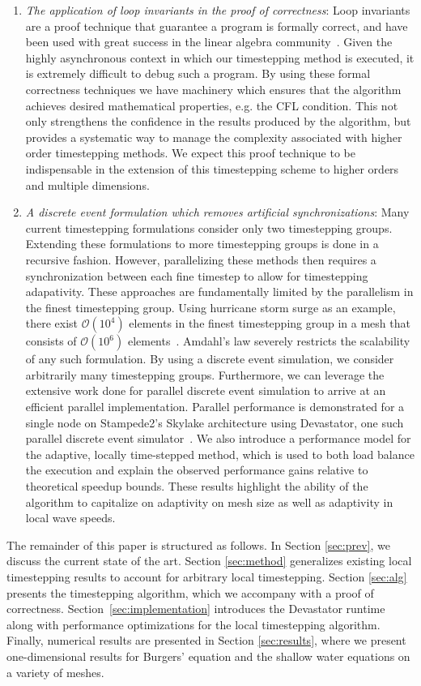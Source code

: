 \begin{enumerate}
    \item {\em The application of loop invariants in the proof of correctness}: Loop invariants are a proof technique that guarantee a program is formally correct, and have been used with great success in the linear algebra community~\cite{Bientinesi2011}. Given the highly asynchronous context in which our timestepping method is executed, it is extremely difficult to debug such a program. By using these formal correctness techniques we have machinery which ensures that the algorithm achieves desired mathematical properties, e.g. the CFL condition. This not only strengthens the confidence in the results produced by the algorithm, but provides a systematic way to manage the complexity associated with higher order timestepping methods. We expect this proof technique to be indispensable in the extension of this timestepping scheme to higher orders and multiple dimensions.
    \item {\em A discrete event formulation which removes artificial synchronizations}: Many current timestepping formulations consider only two timestepping groups. Extending these formulations to more timestepping groups is done in a recursive fashion. However, parallelizing these methods then requires a synchronization between each fine timestep to allow for timestepping adapativity. These approaches are fundamentally limited by the parallelism in the finest timestepping group. Using hurricane storm surge as an example, there exist $\mathcal{O}(10^4)$ elements in the finest timestepping group in a mesh that consists of $\mathcal{O}(10^6)$ elements~\cite{Dawson2013}. Amdahl's law severely restricts the scalability of any such formulation. By using a discrete event simulation, we consider arbitrarily many timestepping groups. Furthermore, we can leverage the extensive work done for parallel discrete event simulation to arrive at an efficient parallel implementation. Parallel performance is demonstrated for a single node on Stampede2's Skylake architecture using Devastator, one such parallel discrete event simulator~\cite{Chan2018}. We also introduce a performance model for the adaptive, locally time-stepped method, which is used to both load balance the execution and explain the observed performance gains relative to theoretical speedup bounds.  These results highlight the ability of the algorithm to capitalize on adaptivity on mesh size as well as adaptivity in local wave speeds.
\end{enumerate}

The remainder of this paper is structured as follows. In Section \ref{sec:prev}, we discuss the current state of the art. Section \ref{sec:method} generalizes existing local timestepping results to account for arbitrary local timestepping. Section \ref{sec:alg} presents the timestepping algorithm, which we accompany with a proof of correctness. Section~\ref{sec:implementation} introduces the Devastator runtime along with performance optimizations for the local timestepping algorithm. Finally, numerical results are presented in Section \ref{sec:results}, where we present one-dimensional results for Burgers' equation and the shallow water equations on a variety of meshes.
